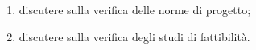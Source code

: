 \begin{enumerate}
    \item discutere sulla verifica delle norme di progetto;
    \item discutere sulla verifica degli studi di fattibilità.
\end{enumerate}